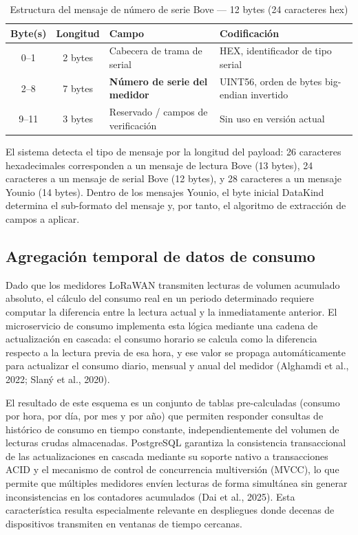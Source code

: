 \documentclass[12pt,a4paper,oneside]{report}
\begin{document}
\begin{table}[H]
\caption{Estructura del mensaje de número de serie Bove --- 12 bytes (24 caracteres hex)}
\label{tab:payload-serial}
\centering
\begin{tabularx}{\textwidth}{ccXl}
\toprule
\textbf{Byte(s)} & \textbf{Longitud} & \textbf{Campo} & \textbf{Codificación} \\
\midrule
0--1 & 2 bytes & Cabecera de trama de serial & HEX, identificador de tipo serial \\
2--8 & 7 bytes & \textbf{Número de serie del medidor} & UINT56, orden de bytes big-endian invertido \\
9--11 & 3 bytes & Reservado / campos de verificación & Sin uso en versión actual \\
\bottomrule
\end{tabularx}
\end{table}

El sistema detecta el tipo de mensaje por la longitud del payload: 26 caracteres hexadecimales corresponden a un mensaje de lectura Bove (13 bytes), 24 caracteres a un mensaje de serial Bove (12 bytes), y 28 caracteres a un mensaje Younio (14 bytes). Dentro de los mensajes Younio, el byte inicial DataKind determina el sub-formato del mensaje y, por tanto, el algoritmo de extracción de campos a aplicar.

\subsection{Agregación temporal de datos de consumo}

Dado que los medidores LoRaWAN transmiten lecturas de volumen acumulado absoluto, el cálculo del consumo real en un periodo determinado requiere computar la diferencia entre la lectura actual y la inmediatamente anterior. El microservicio de consumo implementa esta lógica mediante una cadena de actualización en cascada: el consumo horario se calcula como la diferencia respecto a la lectura previa de esa hora, y ese valor se propaga automáticamente para actualizar el consumo diario, mensual y anual del medidor (Alghamdi et al., 2022; Slaný et al., 2020).

El resultado de este esquema es un conjunto de tablas pre-calculadas (consumo por hora, por día, por mes y por año) que permiten responder consultas de histórico de consumo en tiempo constante, independientemente del volumen de lecturas crudas almacenadas. PostgreSQL garantiza la consistencia transaccional de las actualizaciones en cascada mediante su soporte nativo a transacciones ACID y el mecanismo de control de concurrencia multiversión (MVCC), lo que permite que múltiples medidores envíen lecturas de forma simultánea sin generar inconsistencias en los contadores acumulados (Dai et al., 2025). Esta característica resulta especialmente relevante en despliegues donde decenas de dispositivos transmiten en ventanas de tiempo cercanas.
\end{document}
